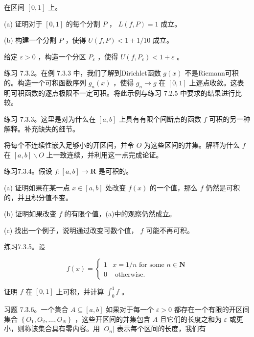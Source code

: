 在区间 \(\left\lbrack  {0,1}\right\rbrack\) 上。

(a) 证明对于 \(\left\lbrack  {0,1}\right\rbrack\) 的每个分割 \(P\) ， \(L\left( {f,P}\right)  = 1\) 成立。

(b) 构建一个分割 \(P\) ，使得 \(U\left( {f,P}\right)  < 1 + 1/{10}\) 成立。

给定 \(\varepsilon  > 0\) ，构造一个分区 \({P}_{\varepsilon }\) ，使得 \(U\left( {f,{P}_{\varepsilon }}\right)  < 1 + \varepsilon\) 。

练习 7.3.2。在例 7.3.3 中，我们了解到Dirichlet函数 \(g\left( x\right)\) 不是Riemann可积的。构造一个可积函数序列 \({g}_{n}\left( x\right)\) ，使得 \({g}_{n} \rightarrow  g\) 在 \(\left\lbrack  {0,1}\right\rbrack\) 上逐点收敛。这表明可积函数的逐点极限不一定可积。将此示例与练习 7.2.5 中要求的结果进行比较。

练习 7.3.3。这里是对为什么在 \(\left\lbrack  {a,b}\right\rbrack\) 上具有有限个间断点的函数 \(f\) 可积的另一种解释。补充缺失的细节。

将每个不连续性嵌入足够小的开区间，并令 \(O\) 为这些区间的并集。解释为什么 \(f\) 在 \(\left\lbrack  {a,b}\right\rbrack   \smallsetminus  O\) 上一致连续，并利用这一点完成论证。

练习7.3.4。假设 \(f : \left\lbrack  {a,b}\right\rbrack   \rightarrow  \mathbf{R}\) 是可积的。

(a) 证明如果在某一点 \(x \in  \left\lbrack  {a,b}\right\rbrack\) 处改变 \(f\left( x\right)\) 的一个值，那么 \(f\) 仍然是可积的，并且积分值不变。

(b) 证明如果改变 \(f\) 的有限个值，(a)中的观察仍然成立。

(c) 找出一个例子，说明通过改变可数个值， \(f\) 可能不再可积。

练习7.3.5。设

\[
f\left( x\right)  = \left\{  \begin{array}{ll} 1 & x = 1/n\text{ for some }n \in  \mathbf{N} \\  0 & \text{ otherwise. } \end{array}\right.
\]

证明 \(f\) 在 \(\left\lbrack  {0,1}\right\rbrack\) 上可积，并计算 \({\int }_{0}^{1}f\) 。

习题 7.3.6。一个集合 \(A \subseteq  \left\lbrack  {a,b}\right\rbrack\) 如果对于每一个 \(\varepsilon  > 0\) 都存在一个有限的开区间集合 \(\left\{  {{O}_{1},{O}_{2},\ldots ,{O}_{N}}\right\}\) ，这些开区间的并集包含 \(A\) 且它们的长度之和为 \(\varepsilon\) 或更小，则称该集合具有零内容。用 \(\left| {O}_{n}\right|\) 表示每个区间的长度，我们有

